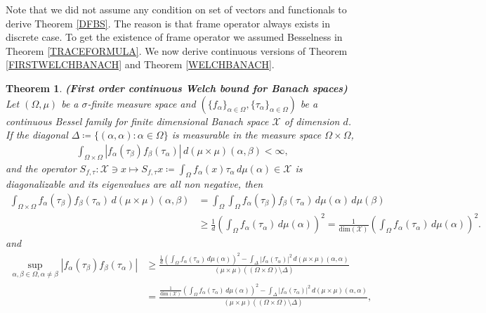 \documentclass{amsart}
\newtheorem{theorem}{Theorem}[section]
\begin{document}
  Note that we did not assume   any condition on set of vectors and functionals to derive Theorem \ref{DFBS}. The reason is that frame operator always exists in discrete case. To get  the existence of frame operator we assumed Besselness in Theorem \ref{TRACEFORMULA}. We now derive continuous versions of Theorem  \ref{FIRSTWELCHBANACH}   and Theorem \ref{WELCHBANACH}.
 \begin{theorem}\label{FIRSTORDERCONTINUOUS}
	\textbf{(First order  continuous Welch bound for Banach spaces)}  Let $(\Omega, \mu)$ be a $\sigma$-finite measure space and $(\{f_\alpha\}_{\alpha\in \Omega}, \{\tau_\alpha\}_{\alpha\in \Omega})$ be a 	 continuous Bessel  family for finite dimensional Banach space $\mathcal{X}$ of dimension $d$. If the diagonal $\Delta\coloneqq \{(\alpha, \alpha):\alpha \in \Omega\}$ is measurable in the measure space $\Omega\times \Omega$,
	\begin{align*}
		\int_{\Omega\times\Omega}|f_\alpha(\tau_\beta)f_\beta(\tau_\alpha)|\, d(\mu\times\mu)(\alpha,\beta)<\infty,
	\end{align*} 
and the operator $	S_{f, \tau}:\mathcal{X}\ni x \mapsto S_{f, \tau}x\coloneqq \int_{\Omega}f_\alpha(x)\tau_\alpha \, d\mu (\alpha) \in\mathcal{X}$  is diagonalizable and its eigenvalues are all non negative,  then 
	\begin{align}\label{1}
  		\int_{\Omega\times\Omega}f_\alpha(\tau_\beta)f_\beta(\tau_\alpha)\, d(\mu\times\mu)(\alpha,\beta)&=\int_{\Omega}\int_{\Omega}f_\alpha(\tau_\beta)f_\beta(\tau_\alpha)\, d \mu(\alpha)\, d \mu(\beta)\nonumber\\
  		&\geq \frac{1}{d}	\left(\int_{\Omega}
  		f_\alpha(\tau_\alpha)\, d \mu(\alpha)\right)^2=	\frac{1}{\text{dim}(\mathcal{X})}\left(\int_{\Omega}
  		f_\alpha(\tau_\alpha)\, d \mu(\alpha)\right)^2.
  	\end{align}	
  	and 
  \begin{align*}
  		\sup _{\alpha, \beta \in \Omega, \alpha\neq \beta}|f_\alpha(\tau_\beta)f_\beta(\tau_\alpha)|&\geq \frac{\frac{1}{d}	\left(\int_{\Omega}
  			f_\alpha(\tau_\alpha)\, d \mu(\alpha)\right)^2-	\int_{\Delta}|f_\alpha(\tau_\alpha)|^2\, d(\mu\times\mu)(\alpha,\alpha)}{(\mu\times\mu)((\Omega\times\Omega)\setminus\Delta)}\\
  		&=\frac{\frac{1}{\text{dim}(\mathcal{X})}	\left(\int_{\Omega}
  			f_\alpha(\tau_\alpha)\, d \mu(\alpha)\right)^2-	\int_{\Delta}|f_\alpha(\tau_\alpha)|^2\, d(\mu\times\mu)(\alpha,\alpha)}{(\mu\times\mu)((\Omega\times\Omega)\setminus\Delta)},
  \end{align*}

\end{theorem}
\end{document}
